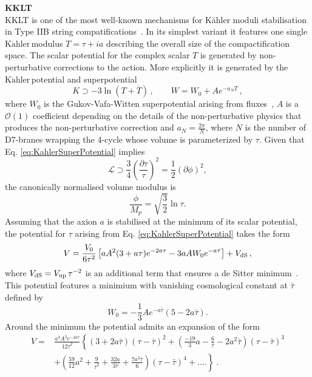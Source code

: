 \documentclass[11pt,a4paper]{article}
\newcommand{\Kahler}{\ensuremath{\text{K}\ddot{\text{a}}\text{hler}\,}}
\begin{document}
\noindent \textbf{KKLT}\\
\noindent KKLT is one of the most well-known mechanisms for K\"ahler moduli stabilisation in Type IIB string compatifications~\cite{Kachru:2003aw}. In its  simplest variant it features one single \Kahler modulus $T = \tau + i a$ describing the overall size of the compactification space. The scalar potential for the complex scalar $T $ is generated by non-perturbative corrections to the action. More explicitly it is generated by the \Kahler potential and superpotential 
\begin{equation}
\label{eq:KahlerSuperPotential}
K \supset -3 \ln\left(T + \overline{T}\right) \,, \qquad W = W_0 + A e^{-a_N T} \,,
\end{equation}
where $W_0$ is the Gukov-Vafa-Witten superpotential arising from fluxes~\cite{Gukov:1999ya}, $A$ is a $\mathcal{O}(1)$ coefficient depending on the details of the non-perturbative physics that produces the non-perturbative correction and $a_N = \frac{2 \pi}{N}$, where $N$ is the number of D7-branes wrapping the 4-cycle whose volume is parameterized by $\tau$. 
Given that Eq. \eqref{eq:KahlerSuperPotential} implies
\begin{equation}
\mathcal{L}\supset \frac{3}{4} \left(\frac{\partial\tau}{\tau}\right)^2=\frac{1}{2} (\partial \phi)^2,
\end{equation}
the canonically normalised volume modulus is
\begin{equation}
\frac{\phi}{M_p}=\sqrt{\frac{3}{2}}\ln\tau .
\label{eq:cannorm}
\end{equation}
Assuming that the axion $a$ is stabilised at the minimum of its scalar potential, the potential for $\tau$ arising from Eq. \eqref{eq:KahlerSuperPotential} takes the form
\begin{equation}
V = \frac{V_0}{6 \tau^2} \left[a A^2 (3 + a \tau) e^{-2 a \tau} - 3 a A W_0 e^{-a \tau}\right] + V_{\rm dS} \,,
\end{equation}
where $V_{\rm dS} = V_{\rm up} \, \tau^{-2}$ is an additional term that ensures a de Sitter minimum~\cite{Kachru:2003aw}. This potential features a minimium with vanishing cosmological constant at $\bar{\tau}$ defined by 
\begin{equation}
W_0=-\frac{1}{3}A e^{-a \bar{\tau}}(5-2 a \bar{\tau}).
\end{equation}
Around the minimum the potential admits an expansion of the form
\begin{equation}
\begin{split}
V=&\frac{a^3 A^2 e^{-2 a \bar{\tau}}}{12 \bar{\tau}^2}\left\{(3+2 a \bar{\tau})(\tau-\bar{\tau})^2+\left(\frac{-19 }{3}a-\frac{6}{\bar{\tau}}-2 a^2 \bar{\tau}\right)(\tau-\bar{\tau})^3\right.\\
&\left.+\left(\frac{59}{12}a^2+\frac{9}{\bar{\tau}^2}+\frac{32 a}{3 \bar{\tau}}+\frac{7 a^3 \bar{\tau}}{6}\right)(\tau-\bar{\tau})^4+....\right\}\ .
\end{split}
\label{eq:VKKLMTmin}
\end{equation}
\end{document}
